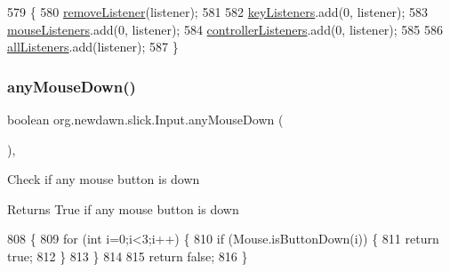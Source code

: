 \begin{DoxyCode}
579                                                            \{
580         \mbox{\hyperlink{classorg_1_1newdawn_1_1slick_1_1_input_aae571a447fe305999e44efaf86c15251}{removeListener}}(listener);
581         
582         \mbox{\hyperlink{classorg_1_1newdawn_1_1slick_1_1_input_a9a68e6a9e9441fea9793f57603be2f96}{keyListeners}}.add(0, listener);
583         \mbox{\hyperlink{classorg_1_1newdawn_1_1slick_1_1_input_a14f9c58eb48c498073f11c6934d92998}{mouseListeners}}.add(0, listener);
584         \mbox{\hyperlink{classorg_1_1newdawn_1_1slick_1_1_input_a762495b937bf0e42b5dbfaa29bdb1b98}{controllerListeners}}.add(0, listener);
585         
586         \mbox{\hyperlink{classorg_1_1newdawn_1_1slick_1_1_input_a26d5ed77d8b0444118d630336d0ab6d7}{allListeners}}.add(listener);
587     \}
\end{DoxyCode}
\mbox{\label{classorg_1_1newdawn_1_1slick_1_1_input_a464c573c84e5d67e2845b8745370c7a7}} 
\subsubsection{\texorpdfstring{any\+Mouse\+Down()}{anyMouseDown()}}
{\footnotesize\ttfamily boolean org.\+newdawn.\+slick.\+Input.\+any\+Mouse\+Down (\begin{DoxyParamCaption}{ }\end{DoxyParamCaption})\hspace{0.3cm}{\ttfamily [inline]}, {\ttfamily [private]}}

Check if any mouse button is down

\begin{DoxyReturn}{Returns}
True if any mouse button is down 
\end{DoxyReturn}

\begin{DoxyCode}
808                                    \{
809         \textcolor{keywordflow}{for} (\textcolor{keywordtype}{int} i=0;i<3;i++) \{
810             \textcolor{keywordflow}{if} (Mouse.isButtonDown(i)) \{
811                 \textcolor{keywordflow}{return} \textcolor{keyword}{true};
812             \}
813         \}
814         
815         \textcolor{keywordflow}{return} \textcolor{keyword}{false};
816     \}
\end{DoxyCode}
\mbox{\label{classorg_1_1newdawn_1_1slick_1_1_input_af2cfc367b630baff82ee280cbc394244}} 
